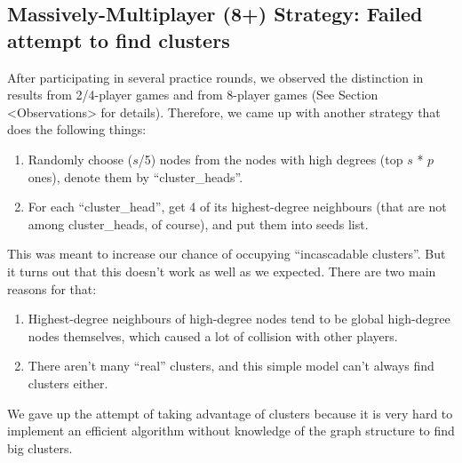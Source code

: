\documentclass[12pt]{article}
\begin{document}
\subsection{Massively-Multiplayer (8+) Strategy: Failed attempt to find clusters}
After participating in several practice rounds, we observed the distinction in results from 2/4-player games and from 8-player games (See Section <Observations> for details). Therefore, we came up with another strategy that does the following things:
\begin{enumerate}
\item Randomly choose ($s$/5) nodes from the nodes with high degrees (top $s$ * $p$ ones), denote them by ``cluster_heads''. 
\item For each ``cluster_head'', get 4 of its highest-degree neighbours (that are not among cluster_heads, of course), and put them into seeds list. 
\end{enumerate}
This was meant to increase our chance of occupying ``incascadable clusters''. But it turns out that this doesn't work as well as we expected. There are two main reasons for that:
\begin{enumerate}
\item Highest-degree neighbours of high-degree nodes tend to be global high-degree nodes themselves, which caused a lot of collision with other players.
\item There aren't many ``real'' clusters, and this simple model can't always find clusters either. 
\end{enumerate}
We gave up the attempt of taking advantage of clusters because it is very hard to implement an efficient algorithm without knowledge of the graph structure to find big clusters.  
\end{document}
